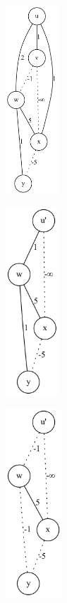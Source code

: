 \documentclass[10.5,a4paper,titlepage, dvipdfmx]{bxjsarticle}
\begin{document}
\begin{figure}[H]
    \centering
    \begin{minipage}{0.48\hsize}
        \centering
        \includegraphics[height=7cm]{f01.png}
        \label{fig:left}
    \end{minipage}
    \begin{minipage}{0.48\hsize}
        \centering
        \includegraphics[height=7cm]{f02.png}
        \label{fig:left-center}
    \end{minipage}
    \begin{minipage}{0.48\hsize}
        \centering
        \includegraphics[height=7cm]{f03.png}

\end{minipage}
\end{figure}
\end{document}
